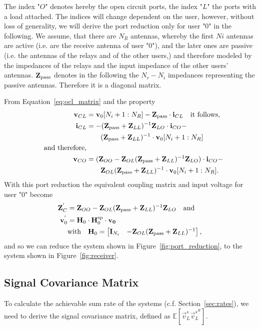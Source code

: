 The index "$O$" denotes hereby the open circuit ports, the index "$L$" the ports with a load attached.
The indices will change dependent on the user, however, without loss of generality, we will derive the port reduction only for user "0" in the following.
We assume, that there are $N_R$ antennas, whereby the first $Ni$ antennas are active (i.e. are the receive antenna of user "0"), and the later ones are passive (i.e. the antennas of the relays and of the other users,) and therefore modeled by the impedances of the relays and the input impedance of the other users' antennas.
$\mathbf{Z}_{\text{pass}}$ denotes in the following the $N_r - N_i$ impedances representing the passive antennas.
Therefore it is a diagonal matrix.

From Equation~\eqref{eq:ocl_matrix} and the property
\begin{align}
\mathbf{v}_{CL} &= \mathbf{v}_0[N_i+1:N_R]-\mathbf{Z}_{\text{pass}}\cdot\mathbf{i}_{CL}\quad\text{it follows,}\\
\mathbf{i}_{CL} &= -(\mathbf{Z}_{\text{pass}} + \mathbf{Z}_{LL})^{-1}\mathbf{Z}_{LO}\cdot\mathbf{i}_{CO} -\\\nonumber
&\qquad (\mathbf{Z}_{\text{pass}} + \mathbf{Z}_{LL})^{-1}\cdot\mathbf{v}_{0}[N_i+1:N_R]\\\nonumber\quad\text{and therefore,}&\\
\mathbf{v}_{CO} &= (\mathbf{Z}_{OO}-\mathbf{Z}_{OL}(\mathbf{Z}_{\text{pass}} + \mathbf{Z}_{LL})^{-1}\mathbf{Z}_{LO})\cdot\mathbf{i}_{CO} -\\\nonumber&\qquad \mathbf{Z}_{OL}(\mathbf{Z}_{\text{pass}} + \mathbf{Z}_{LL})^{-1}\cdot\mathbf{v}_0[N_i+1:N_R].
\end{align}
With this port reduction the equivalent coupling matrix and input voltage for user "0" become
\begin{align}
\label{eq:port_reduction}
\mathbf{Z}_C^{'}&= \mathbf{Z}_{OO} - \mathbf{Z}_{OL}(\mathbf{Z}_{\text{pass}} + \mathbf{Z}_{LL})^{-1}\mathbf{Z}_{LO}\quad\text{and}\\
\mathbf{v}_0^{'} &= \mathbf{H}_0 \cdot\mathbf{H}_{0}^{\text{sp}}\cdot \mathbf{v_0}\\\nonumber
&\text{with}\quad\mathbf{H}_0=
\begin{bmatrix}
\mathbf{I}_{N_i} & -\mathbf{Z}_{OL}(\mathbf{Z}_{\text{pass}} + \mathbf{Z}_{LL})^{-1}
\end{bmatrix},
\end{align}
and so we can reduce the system shown in Figure~\ref{fig:port_reduction}, to the system shown in Figure~\ref{fig:receiver}.

\subsection{Signal Covariance Matrix}
\label{sec:sig_cov}
To calculate the achievable sum rate of the systems (c.f. Section~\ref{sec:rates}), we need to derive the signal covariance matrix, defined as $\mathbb{E}[\vec{v}_L^s\vec{v}_L^{s^H}]$.

